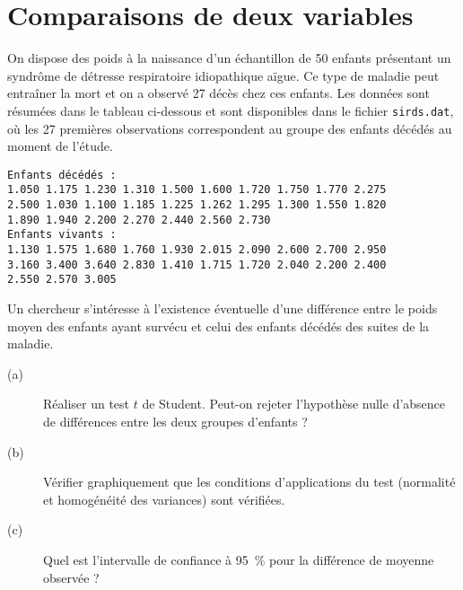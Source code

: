 \chapter{Comparaisons de deux variables}\label{chap:comparaisons}

\begin{exo}\label{exo:3.1}
On dispose des poids à la naissance d'un échantillon de 50 enfants
présentant un syndrôme de détresse respiratoire idiopathique aïgue. Ce type
de maladie peut entraîner la mort et on a observé 27 décès chez ces
enfants. Les données sont résumées dans le tableau ci-dessous et sont
disponibles dans le fichier \texttt{sirds.dat}, où les 27 premières
observations correspondent au groupe des enfants décédés au moment de
l'étude. \autocite[p.~64]{everitt01}
\begin{verbatim}
Enfants décédés :
1.050 1.175 1.230 1.310 1.500 1.600 1.720 1.750 1.770 2.275
2.500 1.030 1.100 1.185 1.225 1.262 1.295 1.300 1.550 1.820
1.890 1.940 2.200 2.270 2.440 2.560 2.730 
Enfants vivants :
1.130 1.575 1.680 1.760 1.930 2.015 2.090 2.600 2.700 2.950 
3.160 3.400 3.640 2.830 1.410 1.715 1.720 2.040 2.200 2.400 
2.550 2.570 3.005
\end{verbatim}
Un chercheur s'intéresse à l'existence éventuelle d'une différence entre le
poids moyen des enfants ayant survécu et celui des enfants décédés des
suites de la maladie. 
\begin{description}
\item[(a)] Réaliser un test $t$ de Student. Peut-on rejeter l'hypothèse nulle
  d'absence de différences entre les deux groupes d'enfants ? 
\item[(b)] Vérifier graphiquement que les conditions d'applications du test
(normalité et homogénéité des variances) sont vérifiées. 
\item[(c)] Quel est l'intervalle de confiance à 95~\% pour la différence de
  moyenne observée ?
\end{description}
\end{exo}

